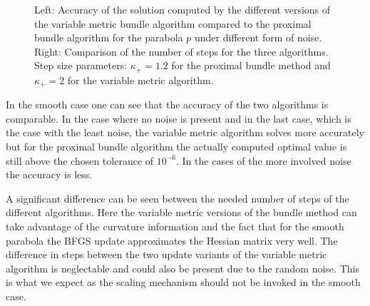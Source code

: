 \begin{figure}[ht]
\begin{subfigure}[t]{0.49\textwidth}
	\end{subfigure}
	\caption[Accuracy and number of steps for the parabola]{Left: Accuracy of the solution computed by the different versions of the variable metric bundle algorithm compared to the proximal bundle algorithm for the parabola \(p\) under different form of noise.\\
	Right: Comparison of the number of steps for the three algorithms.\\
	Step size parameters: \(\kappa_+ = 1.2\) for the proximal bundle method and \(\kappa_+ = 2\) for the variable metric algorithm. }
	\label{fig_bar_parab}
\end{figure}

In the smooth case one can see that the accuracy of the two algorithms is comparable. In the case where no noise is present and in the last case, which is the case with the least noise, the variable metric algorithm solves more accurately but for the proximal bundle algorithm the actually computed optimal value is still above the chosen tolerance of \(10^{-6}\).
In the cases of the more involved noise the accuracy is less.

A significant difference can be seen between the needed number of steps of the different algorithms. Here the variable metric versions of the bundle method can take advantage of the curvature information and the fact that for the smooth parabola the BFGS update approximates the Hessian matrix very well.
The difference in steps between the two update variants of the variable metric algorithm is neglectable and could also be present due to the random noise. This is what we expect as the scaling mechanism should not be invoked in the smooth case.

